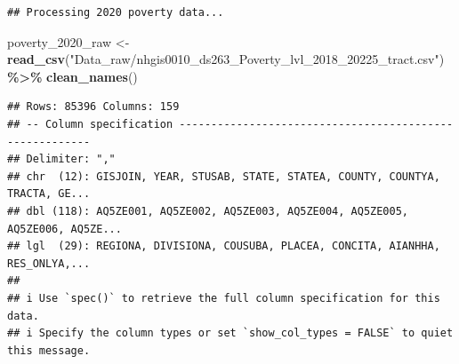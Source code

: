 \documentclass[
]{article}
\newenvironment{Shaded}{\begin{snugshade}}{\end{snugshade}}
\newcommand{\FunctionTok}[1]{\textcolor[rgb]{0.13,0.29,0.53}{\textbf{#1}}}
\newcommand{\NormalTok}[1]{#1}
\newcommand{\OtherTok}[1]{\textcolor[rgb]{0.56,0.35,0.01}{#1}}
\newcommand{\SpecialCharTok}[1]{\textcolor[rgb]{0.81,0.36,0.00}{\textbf{#1}}}
\newcommand{\StringTok}[1]{\textcolor[rgb]{0.31,0.60,0.02}{#1}}
\begin{document}
\begin{verbatim}
## Processing 2020 poverty data...
\end{verbatim}

\begin{Shaded}
\begin{Highlighting}[]
\NormalTok{poverty\_2020\_raw }\OtherTok{\textless{}{-}} \FunctionTok{read\_csv}\NormalTok{(}\StringTok{"Data\_raw/nhgis0010\_ds263\_Poverty\_lvl\_2018\_20225\_tract.csv"}\NormalTok{) }\SpecialCharTok{\%\textgreater{}\%}
  \FunctionTok{clean\_names}\NormalTok{()}
\end{Highlighting}
\end{Shaded}

\begin{verbatim}
## Rows: 85396 Columns: 159
## -- Column specification --------------------------------------------------------
## Delimiter: ","
## chr  (12): GISJOIN, YEAR, STUSAB, STATE, STATEA, COUNTY, COUNTYA, TRACTA, GE...
## dbl (118): AQ5ZE001, AQ5ZE002, AQ5ZE003, AQ5ZE004, AQ5ZE005, AQ5ZE006, AQ5ZE...
## lgl  (29): REGIONA, DIVISIONA, COUSUBA, PLACEA, CONCITA, AIANHHA, RES_ONLYA,...
## 
## i Use `spec()` to retrieve the full column specification for this data.
## i Specify the column types or set `show_col_types = FALSE` to quiet this message.
\end{verbatim}
\end{document}
